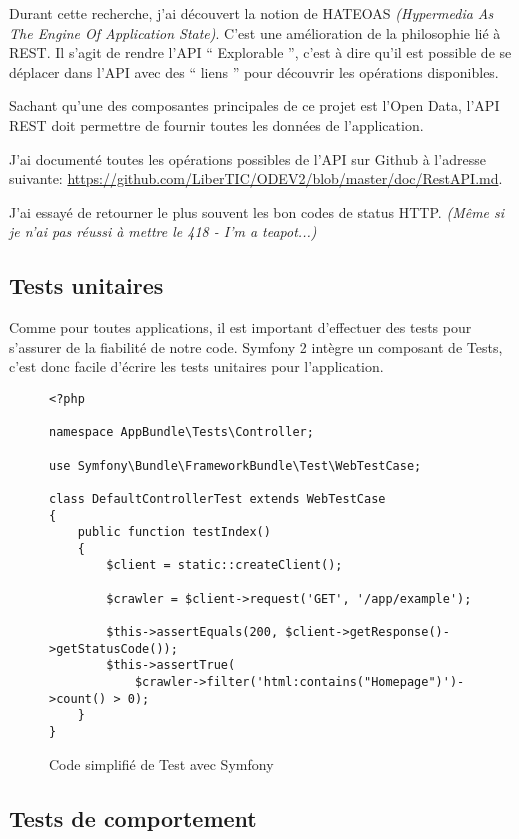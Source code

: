 Durant cette recherche, j'ai découvert la notion de HATEOAS \textit{(Hypermedia As The Engine Of Application State)}. C'est une amélioration de la philosophie lié à REST. Il s'agit de rendre l'API `` Explorable '', c'est à dire qu'il est possible de se déplacer dans l'API avec des `` liens '' pour découvrir les opérations disponibles.

Sachant qu'une des composantes principales de ce projet est l'Open Data, l'API REST doit permettre de fournir toutes les données de l'application.

J'ai documenté toutes les opérations possibles de l'API sur Github à l'adresse suivante: \url{https://github.com/LiberTIC/ODEV2/blob/master/doc/RestAPI.md}.

J'ai essayé de retourner le plus souvent les bon codes de status HTTP. \textit{(Même si je n'ai pas réussi à mettre le 418 - I'm a teapot...)}

\subsection{Tests unitaires}

Comme pour toutes applications, il est important d'effectuer des tests pour s'assurer de la fiabilité de notre code. Symfony 2 intègre un composant de Tests, c'est donc facile d'écrire les tests unitaires pour l'application.

\begin{figure}[h]
\begin{lstlisting}[frame=single]
<?php

namespace AppBundle\Tests\Controller;

use Symfony\Bundle\FrameworkBundle\Test\WebTestCase;

class DefaultControllerTest extends WebTestCase
{
    public function testIndex()
    {
        $client = static::createClient();

        $crawler = $client->request('GET', '/app/example');

        $this->assertEquals(200, $client->getResponse()->getStatusCode());
        $this->assertTrue(
            $crawler->filter('html:contains("Homepage")')->count() > 0);
    }
}

\end{lstlisting}
\caption{Code simplifié de Test avec Symfony}
\end{figure}

\newpage

\subsection{Tests de comportement}

